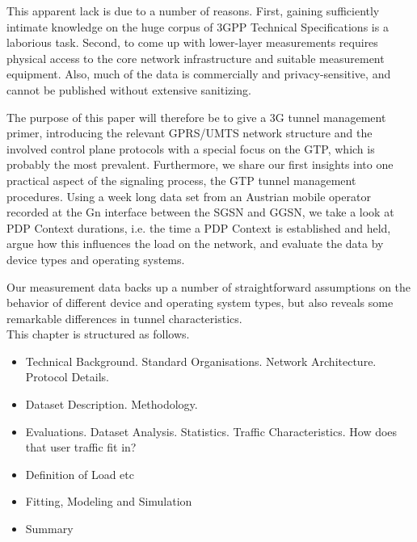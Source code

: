 This apparent lack is due to a number of reasons. First, gaining sufficiently intimate knowledge on the huge corpus of \ac{3GPP} Technical Specifications %
is a laborious task. Second, to come up with lower-layer measurements requires physical access to the core network infrastructure and suitable measurement equipment. Also, much of the data is commercially and privacy-sensitive, and cannot be published without extensive sanitizing.

The purpose of this paper will therefore be to give a 3G tunnel management primer, introducing the relevant \acs{GPRS}/\acs{UMTS} network structure and the involved control plane protocols with a special focus on the \ac{GTP}, which is probably the most prevalent. %
Furthermore, we share our first insights into one practical aspect of the signaling process, the \ac{GTP} tunnel management procedures. Using a week long data set from an Austrian mobile operator recorded at the Gn interface between the \ac{SGSN} and \ac{GGSN}, %
we take a look at \ac{PDP} Context durations, i.e. the time a \ac{PDP} Context is established and held, argue how this influences the load on the network, and evaluate the data by device types and operating systems.

Our measurement data backs up a number of straightforward assumptions on the behavior of different device and operating system types, but also reveals some remarkable differences in tunnel characteristics.\\


This chapter is structured as follows.

\begin{itemize}
\item Technical Background. Standard Organisations. Network Architecture. Protocol Details.
\item Dataset Description. Methodology.
\item Evaluations. Dataset Analysis. Statistics. Traffic Characteristics. How does that user traffic fit in?
\item Definition of Load etc
\item Fitting, Modeling and Simulation
\item Summary
\end{itemize}


